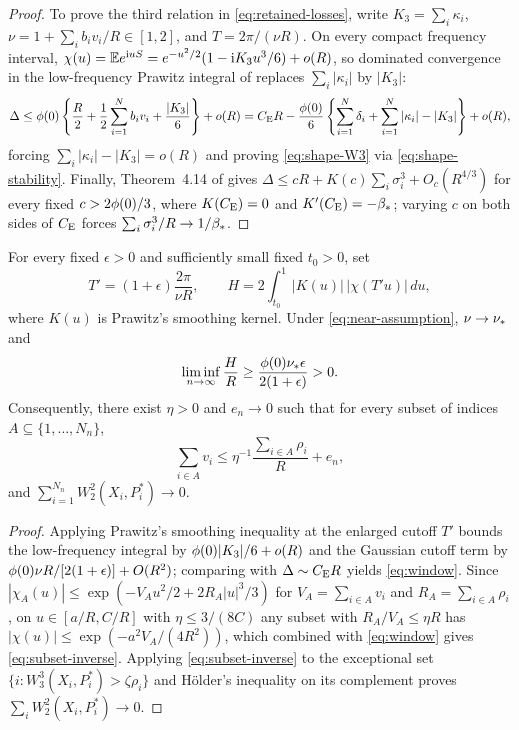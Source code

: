 \begin{proof}
To prove the third relation in \eqref{eq:retained-losses}, write
$K_3=\sum_i\kappa_i$, $\nu=1+\sum_i b_iv_i/R\in[1,2]$, and $T=2\pi/(\nu R)$.
On every compact frequency interval, $\chi(u)=\mathbb E e^{\mathrm i uS}=e^{-u^2/2}(1-\mathrm i K_3u^3/6)+o(R)$,
so dominated convergence in the low-frequency Prawitz integral of
\citet[Lemma~4.1 and (4.4)--(4.7), pp.~263--267]{Shevtsova2012} replaces
$\sum_i|\kappa_i|$ by $|K_3|$:
\begin{equation}\label{eq:signed-loss}
 \Delta\le\phi(0)\left\{\frac R2+\frac12\sum_{i=1}^N b_iv_i
                                  +\frac{|K_3|}{6}\right\}+o(R)
 =C_{\mathrm E} R-\frac{\phi(0)}{6}\left\{\sum_{i=1}^N\delta_i+
                  \sum_{i=1}^N|\kappa_i|-|K_3|\right\}+o(R),
\end{equation}
forcing $\sum_i|\kappa_i|-|K_3|=o(R)$ and proving \eqref{eq:shape-W3} via
\eqref{eq:shape-stability}. Finally, Theorem~4.14 of \citet[pp.~300--303]{Shevtsova2012}
gives $\Delta\le cR+K(c)\sum_i\sigma_i^3+O_c(R^{4/3})$ for every fixed
$c>2\phi(0)/3$, where $K(C_{\mathrm E})=0$ and $K'(C_{\mathrm E})=-\beta_*$; varying $c$ on both sides
of $C_{\mathrm E}$ forces $\sum_i\sigma_i^3/R\to1/\beta_*$.
\end{proof}

\begin{lemma}\label{lem:window}
For every fixed $\epsilon>0$ and sufficiently small fixed $t_0>0$, set
\[
 T'=(1+\epsilon)\frac{2\pi}{\nu R},\qquad
 H=2\int_{t_0}^1|K(u)|\,|\chi(T'u)|\,du,
\]
where $K(u)$ is Prawitz's smoothing kernel. Under \eqref{eq:near-assumption},
$\nu\to\nu_*$ and
\begin{equation}\label{eq:window}
 \liminf_{n\to\infty} \frac{H}{R}\ge\frac{\phi(0)\nu_*\epsilon}{2(1+\epsilon)}>0.
\end{equation}
Consequently, there exist $\eta>0$ and $e_n\to0$ such that for every subset
of indices $A\subseteq\{1,\ldots,N_n\}$,
\begin{equation}\label{eq:subset-inverse}
             \sum_{i\in A}v_i\le\eta^{-1}
                          \frac{\sum_{i\in A}\rho_i}{R}+e_n,
\end{equation}
and $\sum_{i=1}^{N_n}W_2^2(X_i,P_i^*)\to0$.
\end{lemma}
\begin{proof}
Applying Prawitz's smoothing inequality at the enlarged cutoff $T'$ bounds
the low-frequency integral by $\phi(0)|K_3|/6+o(R)$ and the Gaussian cutoff term
by $\phi(0)\nu R/[2(1+\epsilon)]+O(R^2)$; comparing with $\Delta\sim C_{\mathrm E} R$ yields
\eqref{eq:window}. Since $|\chi_A(u)|\le\exp(-V_Au^2/2+2R_A|u|^3/3)$ for
$V_A=\sum_{i\in A}v_i$ and $R_A=\sum_{i\in A}\rho_i$, on $u\in[a/R,C/R]$ with
$\eta\le3/(8C)$ any subset with $R_A/V_A\le\eta R$ has
$|\chi(u)|\le\exp(-a^2V_A/(4R^2))$, which combined with \eqref{eq:window}
gives \eqref{eq:subset-inverse}. Applying \eqref{eq:subset-inverse} to the
exceptional set $\{i:W_3^3(X_i,P_i^*)>\zeta\rho_i\}$ and H\"older's inequality
on its complement proves $\sum_i W_2^2(X_i,P_i^*)\to0$.
\end{proof}

